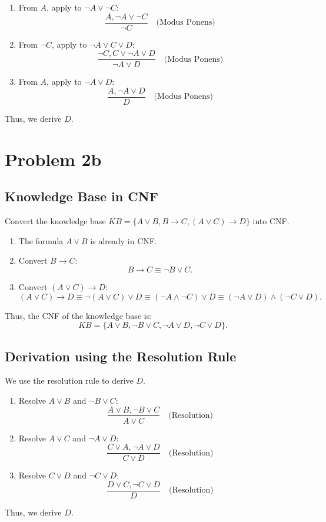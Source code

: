 \documentclass[12pt]{article}
\begin{document}
\begin{enumerate}
    \item From \(A\), apply to \(\neg A \lor \neg C\):
    \[
    \frac{A, \neg A \lor \neg C}{\neg C} \quad \text{(Modus Ponens)}
    \]
    \item From \(\neg C\), apply to \(\neg A \lor C \lor D\):
    \[
    \frac{\neg C, C \lor \neg A \lor D}{\neg A \lor D} \quad \text{(Modus Ponens)}
    \]
    \item From \(A\), apply to \(\neg A \lor D\):
    \[
    \frac{A, \neg A \lor D}{D} \quad \text{(Modus Ponens)}
    \]
\end{enumerate}

Thus, we derive \(D\).

\section*{Problem 2b}

\subsection*{Knowledge Base in CNF}
Convert the knowledge base \(KB = \{A \lor B, B \rightarrow C, (A \lor C) \rightarrow D\}\) into CNF.

\begin{enumerate}
    \item The formula \(A \lor B\) is already in CNF.
    \item Convert \(B \rightarrow C\):
    \[
    B \rightarrow C \equiv \neg B \lor C.
    \]
    \item Convert \((A \lor C) \rightarrow D\):
    \[
    (A \lor C) \rightarrow D \equiv \neg (A \lor C) \lor D \equiv (\neg A \land \neg C) \lor D \equiv (\neg A \lor D) \land (\neg C \lor D).
    \]
\end{enumerate}

Thus, the CNF of the knowledge base is:
\[
KB = \{A \lor B, \neg B \lor C, \neg A \lor D, \neg C \lor D\}.
\]

\subsection*{Derivation using the Resolution Rule}
We use the resolution rule to derive \(D\).

\begin{enumerate}
    \item Resolve \(A \lor B\) and \(\neg B \lor C\):
    \[
    \frac{A \lor B, \neg B \lor C}{A \lor C} \quad \text{(Resolution)}
    \]
    \item Resolve \(A \lor C\) and \(\neg A \lor D\):
    \[
    \frac{C \lor A, \neg A \lor D}{C \lor D} \quad \text{(Resolution)}
    \]
    \item Resolve \(C \lor D\) and \(\neg C \lor D\):
    \[
    \frac{D \lor C, \neg C \lor D}{D} \quad \text{(Resolution)}
    \]
\end{enumerate}

Thus, we derive \(D\).
\end{document}
